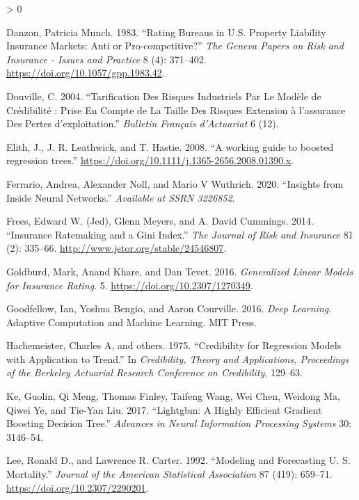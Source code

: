 \documentclass[
]{article}
\newlength{\cslhangindent}
\newenvironment{CSLReferences}[2] %
 {%
  \setlength{\parindent}{0pt}
  \ifodd #1 \everypar{\setlength{\hangindent}{\cslhangindent}}\ignorespaces\fi
  \ifnum #2 > 0
  \setlength{\parskip}{#2\baselineskip}
  \fi
 }%
 {}
\begin{document}
\begin{CSLReferences}{1}{0}
\leavevmode\hypertarget{ref-Danzon1983}{}%
Danzon, Patricia Munch. 1983. {``{Rating Bureaus in U.S. Property
Liability Insurance Markets: Anti or Pro-competitive?}''} \emph{The
Geneva Papers on Risk and Insurance - Issues and Practice} 8 (4):
371--402. \url{https://doi.org/10.1057/gpp.1983.42}.

\leavevmode\hypertarget{ref-douville04}{}%
Douville, C. 2004. {``Tarification Des Risques Industriels Par Le
Mod{è}le de Cr{é}dibilit{é} : Prise En Compte de La Taille Des Risques
Extension {à} l'assurance Des Pertes d'exploitation.''} \emph{Bulletin
Français d'Actuariat} 6 (12).

\leavevmode\hypertarget{ref-Elith2008}{}%
Elith, J., J. R. Leathwick, and T. Hastie. 2008. {``{A working guide to
boosted regression trees}.''}
\url{https://doi.org/10.1111/j.1365-2656.2008.01390.x}.

\leavevmode\hypertarget{ref-ferrario2020insights}{}%
Ferrario, Andrea, Alexander Noll, and Mario V Wuthrich. 2020.
{``Insights from Inside Neural Networks.''} \emph{Available at SSRN
3226852}.

\leavevmode\hypertarget{ref-giniFrees}{}%
Frees, Edward W. (Jed), Glenn Meyers, and A. David Cummings. 2014.
{``Insurance Ratemaking and a Gini Index.''} \emph{The Journal of Risk
and Insurance} 81 (2): 335--66.
\url{http://www.jstor.org/stable/24546807}.

\leavevmode\hypertarget{ref-goldburd2016generalized}{}%
Goldburd, Mark, Anand Khare, and Dan Tevet. 2016. \emph{{Generalized
Linear Models for Insurance Rating}}. 5.
\url{https://doi.org/10.2307/1270349}.

\leavevmode\hypertarget{ref-Goodfellow-et-al-2016}{}%
Goodfellow, Ian, Yoshua Bengio, and Aaron Courville. 2016. \emph{{Deep
Learning}}. Adaptive Computation and Machine Learning. MIT Press.

\leavevmode\hypertarget{ref-hachemeister1975credibility}{}%
Hachemeister, Charles A, and others. 1975. {``Credibility for Regression
Models with Application to Trend.''} In \emph{Credibility, Theory and
Applications, Proceedings of the Berkeley Actuarial Research Conference
on Credibility}, 129--63.

\leavevmode\hypertarget{ref-ke2017lightgbm}{}%
Ke, Guolin, Qi Meng, Thomas Finley, Taifeng Wang, Wei Chen, Weidong Ma,
Qiwei Ye, and Tie-Yan Liu. 2017. {``Lightgbm: A Highly Efficient
Gradient Boosting Decision Tree.''} \emph{Advances in Neural Information
Processing Systems} 30: 3146--54.

\leavevmode\hypertarget{ref-leemodeling1992}{}%
Lee, Ronald D., and Lawrence R. Carter. 1992. {``Modeling and
{Forecasting} {U}. {S}. {Mortality}.''} \emph{Journal of the American
Statistical Association} 87 (419): 659--71.
\url{https://doi.org/10.2307/2290201}.


\end{CSLReferences}
\end{document}
